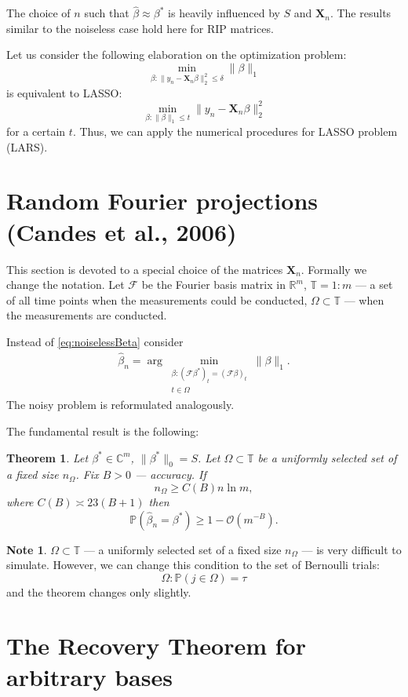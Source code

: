 \documentclass[11pt]{article}
\numberwithin{equation}{section}
\newtheorem{theorem}{Theorem}[section]
\theoremstyle{definition}
\newtheorem{remark}{Note}[section]
\begin{document}
The choice of $n$ such that $\hat \beta \approx \beta^*$ is heavily influenced by $S$ and $\mathbf X_n$.
The results similar to the noiseless case hold here for RIP matrices.

Let us consider the following elaboration on the optimization problem:
$$ \min_{\beta: \|y_n - \mathbf X_n \beta\|_2^2 \leqslant \delta} \|\beta\|_1 $$
is equivalent to LASSO:
$$ \min_{\beta: \|\beta\|_1 \leqslant t} \|y_n - \mathbf X_n \beta\|_2^2 $$
for a certain $t$.
Thus, we can apply the numerical procedures for LASSO problem (LARS).

\section{Random Fourier projections (Candes et al., 2006)}

This section is devoted to a special choice of the matrices $\mathbf X_n$.
Formally we change the notation.
Let $\mathcal F$ be the Fourier basis matrix in $\mathbb R^m$, $\mathbb T = 1:m$ --- a set of all time points when the measurements could be conducted, $\Omega \subset \mathbb T$ --- when the measurements are conducted.

Instead of \eqref{eq:noiselessBeta} consider
\begin{gather}
    \hat \beta_n = \arg \min_{\substack{\beta: (\mathcal F \beta^*)_t = (\mathcal F \beta)_t \\ t \in \Omega}} \|\beta\|_1.
\end{gather}
The noisy problem is reformulated analogously.

The fundamental result is the following:
\begin{theorem}
    Let $\beta^* \in \mathbb C^m$, $\|\beta^*\|_0 = S$. Let $\Omega \subset \mathbb T$ be a uniformly selected set of a fixed size $n_\Omega$.
    Fix $B > 0$ --- accuracy.
    If
    $$ n_\Omega \geq C(B) n \ln m, $$
    where $C(B) \asymp 23(B + 1)$ then
    $$ \mathbb P(\hat \beta_n = \beta^*) \geq 1 - \mathcal O(m^{-B}). $$
\end{theorem}

\begin{remark}
    $\Omega \subset \mathbb T$ --- a uniformly selected set of a fixed size $n_\Omega$ --- is very difficult to simulate.
    However, we can change this condition to the set of Bernoulli trials:
    $$ \Omega: \mathbb P(j \in \Omega) = \tau $$
    and the theorem changes only slightly.
\end{remark}

\section{The Recovery Theorem for arbitrary bases}
\end{document}
